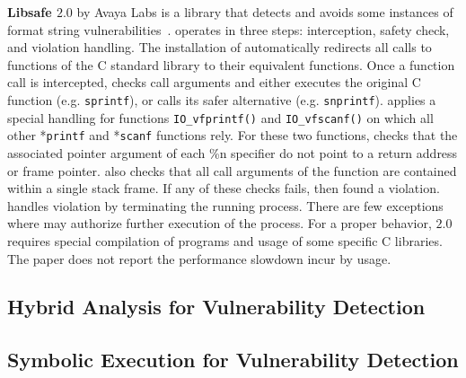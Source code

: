 \textbf{Libsafe $2.0$} by Avaya Labs is a library
that detects and avoids some instances of format string
vulnerabilities~\cite{Tsai:2001:libsafe}. 
\libsafe operates in three steps: interception, safety check,
and violation handling. 
The installation of \libsafe automatically redirects all calls
to functions of the C standard library to their equivalent
\libsafe functions.
Once a function call is intercepted, \libsafe checks call
arguments and either executes the original C function
(e.g. \texttt{sprintf}), or calls its safer alternative
(e.g. \texttt{snprintf}).
\libsafe applies a special handling for functions
\texttt{IO\_vfprintf()} and \texttt{IO\_vfscanf()} on which
all other *\texttt{printf} and *\texttt{scanf} functions rely.
For these two functions, \libsafe checks that the associated
pointer argument of each \%n specifier do not point to
a return address or frame pointer.
\libsafe also checks that all call arguments of the function
are contained within a single stack frame. If any of these
checks fails, then \libsafe found a violation.
\libsafe handles violation by terminating the running process.
There are few exceptions where \libsafe may authorize further
execution of the process.
For a proper behavior, \libsafe $2.0$ requires special
compilation of programs and usage of some specific C
libraries. The paper does not report the performance
slowdown incur by \libsafe usage.

\subsection{Hybrid Analysis for Vulnerability Detection}
 \cite{Trip:2011:HAJSA}

\subsection{Symbolic Execution for Vulnerability Detection}

